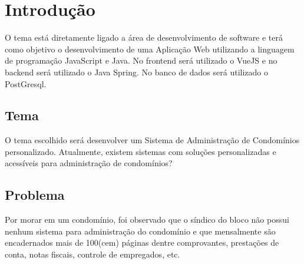 \chapter{Introdução}
\label{chp:introduction}
O tema está diretamente ligado a área de desenvolvimento de software e terá como
objetivo o desenvolvimento de uma Aplicação Web utilizando a linguagem de programação
JavaScript e Java. No frontend será utilizado o VueJS e no backend será utilizado
o Java Spring. No banco de dados será utilizado o PostGresql.

\section{Tema}
O tema escolhido será desenvolver um Sistema de Administração de Condomínios
personalizado. Atualmente, existem sistemas com soluções personalizadas e acessíveis
para administração de condomínios?
\section{Problema}
Por morar em um condomínio, foi observado que o síndico do bloco não possui
nenhum sistema para administração do condomínio e que mensalmente são encadernados
mais de 100(cem) páginas dentre comprovantes, prestações de conta, notas fiscais,
controle de empregados, etc.

